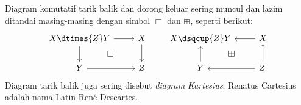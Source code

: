 \begin{convention}
	Diagram komutatif tarik balik dan dorong keluar sering muncul dan lazim ditandai masing-masing dengan simbol $\Box$ dan $\boxplus$, seperti berikut:
	\begin{equation}\begin{tikzcd}
		X \dtimes{Z} Y \arrow[r] \arrow[d] & X \arrow[d] \arrow[ld, phantom, "\Box" description] \\
		Y \arrow[r] & Z
	\end{tikzcd}
	\qquad
	\begin{tikzcd}
		X \dsqcup{Z} Y & X \arrow[l] \arrow[ld, phantom, "\boxplus" description] \\
		Y \arrow[u] & Z \arrow[u] \arrow[l] .
	\end{tikzcd}\end{equation}
	Diagram tarik balik juga sering disebut \emph{diagram Kartesius}; Renatus Cartesius adalah nama Latin René Descartes.
\end{convention}

